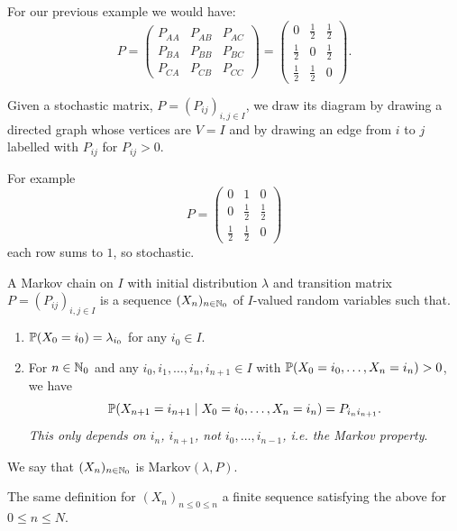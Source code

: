 \documentclass[10pt, a4paper]{article}
\begin{document}
\begin{example}
    For our previous example we would have:
    \[
    P = \begin{pmatrix}
        P_{AA} & P_{AB} & P_{AC} \\
        P_{BA} & P_{BB} & P_{BC} \\
        P_{CA} & P_{CB} & P_{CC}
    \end{pmatrix} =
    \begin{pmatrix}
        0 & \frac{1}{2} & \frac{1}{2} \\
        \frac{1}{2} & 0 & \frac{1}{2} \\
        \frac{1}{2} & \frac{1}{2} & 0
    \end{pmatrix}.
    \]
\end{example}

\begin{definition}
    Given a stochastic matrix,
    $P = (P_{ij})_{i, j \in I}$,
    we draw its diagram by drawing a directed graph whose vertices are $V = I$ and by drawing an edge from $i$ to $j$ labelled with $P_{ij}$ for $P_{ij} > 0$.
\end{definition}
For example
\[
P = \begin{pmatrix}
    0 & 1 & 0 \\
    0 & \frac{1}{2} & \frac{1}{2} \\
    \frac{1}{2} & \frac{1}{2} & 0
\end{pmatrix}
\]
each row sums to $1$,
so stochastic.

\begin{definition}
    A Markov chain on $I$ with initial distribution $\lambda$ and transition matrix $P = (P_{ij})_{i, j \in I}$ is a sequence $(X_n)_{n \in \N_0}$ of $I$-valued random variables such that.

    \begin{enumerate}[label = (\roman*)]
        \item $\P(X_0 = i_0) = \lambda_{i_0}$ for any $i_0 \in I$.

        \item For $n \in \N_0$ and any $i_0, i_1, \dotsc, i_n, i_{n + 1} \in I$ with $\P(X_0 = i_0, \dotsc, X_n = i_n) > 0$,
        we have
        \[
        \P(X_{n + 1} = i_{n + 1} \mid X_0 = i_0, \dotsc, X_n = i_n) = P_{i_ni_{n + 1}}.
        \]
        \textit{This only depends on $i_n$,
        $i_{n + 1}$,
        not $i_0, \dotsc, i_{n - 1}$,
        i.e. the Markov property}.
    \end{enumerate}
    We say that $(X_n)_{n \in \N_0}$ is $\mathrm{Markov}(\lambda, P)$.
\end{definition}
The same definition for $(X_n)_{n \leq 0 \leq n}$ a finite sequence satisfying the above for $0 \leq n \leq N$.
\end{document}
